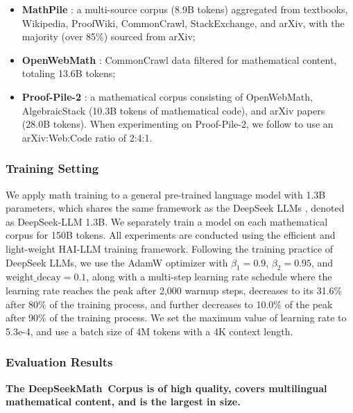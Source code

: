 \begin{itemize}[topsep=0pt]
    \item \textbf{MathPile} \citep{mathpile}: a multi-source corpus (8.9B tokens) aggregated from textbooks, Wikipedia, ProofWiki, CommonCrawl, StackExchange, and arXiv, with the majority (over 85\%) sourced from arXiv;
    \item \textbf{OpenWebMath} \citep{openwebmath}: CommonCrawl data filtered for mathematical content, totaling 13.6B tokens;
    \item \textbf{Proof-Pile-2} \citep{llemma}: a mathematical corpus consisting of OpenWebMath, AlgebraicStack (10.3B tokens of mathematical code), and arXiv papers (28.0B tokens). When experimenting on Proof-Pile-2, we follow \cite{llemma} to use an arXiv:Web:Code ratio of 2:4:1.
\end{itemize}

\subsubsection{Training Setting}
\label{sec:quality-policy}
We apply math training to a general pre-trained language model with 1.3B parameters, which shares the same framework as the DeepSeek LLMs \citep{deepseek-llm}, denoted as DeepSeek-LLM 1.3B. We separately train a model on each mathematical corpus for 150B tokens. All experiments are conducted using the efficient and light-weight HAI-LLM \citep{haillm} training framework. Following the training practice of DeepSeek LLMs, we use the AdamW optimizer \citep{adamW} with $\beta_1=0.9$, $\beta_2=0.95$, and $\mathrm{weight\_decay}=0.1$, along with a multi-step learning rate schedule where the learning rate reaches the peak after 2,000 warmup steps, decreases to its 31.6\% after 80\% of the training process, and further decreases to 10.0\% of the peak after 90\% of the training process. We set the maximum value of learning rate to 5.3e-4, and use a batch size of 4M tokens with a 4K context length.

\subsubsection{Evaluation Results}

\textbf{The DeepSeekMath~Corpus is of high quality, covers multilingual mathematical content, and is the largest in size.}

